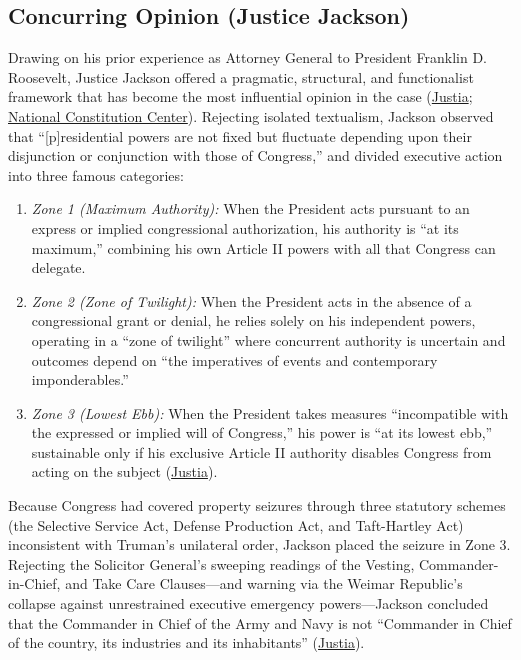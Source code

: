 \documentclass[12pt]{article}
\begin{document}
\subsection{Concurring Opinion (Justice Jackson)}
Drawing on his prior experience as Attorney General to President Franklin D. Roosevelt, Justice Jackson offered a pragmatic, structural, and functionalist framework that has become the most influential opinion in the case (\href{https://supreme.justia.com/cases/federal/us/343/579/}{Justia}; \href{https://constitutioncenter.org/blog/the-youngstown-case-three-approaches-to-interpreting-presidential-power}{National Constitution Center}). Rejecting isolated textualism, Jackson observed that ``[p]residential powers are not fixed but fluctuate depending upon their disjunction or conjunction with those of Congress,'' and divided executive action into three famous categories:
\begin{enumerate}
\item \textit{Zone 1 (Maximum Authority):} When the President acts pursuant to an express or implied congressional authorization, his authority is ``at its maximum,'' combining his own Article II powers with all that Congress can delegate.
\item \textit{Zone 2 (Zone of Twilight):} When the President acts in the absence of a congressional grant or denial, he relies solely on his independent powers, operating in a ``zone of twilight'' where concurrent authority is uncertain and outcomes depend on ``the imperatives of events and contemporary imponderables.''
\item \textit{Zone 3 (Lowest Ebb):} When the President takes measures ``incompatible with the expressed or implied will of Congress,'' his power is ``at its lowest ebb,'' sustainable only if his exclusive Article II authority disables Congress from acting on the subject (\href{https://supreme.justia.com/cases/federal/us/343/579/}{Justia}).
\end{enumerate}
Because Congress had covered property seizures through three statutory schemes (the Selective Service Act, Defense Production Act, and Taft-Hartley Act) inconsistent with Truman's unilateral order, Jackson placed the seizure in Zone 3. Rejecting the Solicitor General's sweeping readings of the Vesting, Commander-in-Chief, and Take Care Clauses---and warning via the Weimar Republic's collapse against unrestrained executive emergency powers---Jackson concluded that the Commander in Chief of the Army and Navy is not ``Commander in Chief of the country, its industries and its inhabitants'' (\href{https://supreme.justia.com/cases/federal/us/343/579/}{Justia}).
\end{document}
